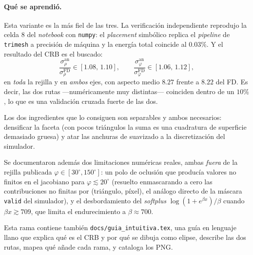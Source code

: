 \documentclass[11pt,a4paper]{article}
\newcommand{\code}[1]{\texttt{#1}}
\theoremstyle{definition}
\begin{document}
\paragraph{Qué se aprendió.}
Esta variante es la más fiel de las tres. La verificación independiente
reprodujo la celda 8 del \emph{notebook} con \code{numpy}: el \emph{placement}
simbólico replica el \emph{pipeline} de \code{trimesh} a precisión de máquina y
la energía total coincide al $0.03\%$. Y el resultado del CRB es el buscado:
%
\begin{equation}
\frac{\sigma_\rho^{\text{an}}}{\sigma_\rho^{\text{FD}}}\in[1.08,\,1.10],
\qquad
\frac{\sigma_\varphi^{\text{an}}}{\sigma_\varphi^{\text{FD}}}\in[1.06,\,1.12],
\end{equation}
%
en \emph{toda} la rejilla y en \emph{ambos} ejes, con aspecto medio $8.27$
frente a $8.22$ del FD. Es decir, las dos rutas ---numéricamente muy distintas---
coinciden dentro de un $10\%$, lo que es una validación cruzada fuerte de las
dos.

Los dos ingredientes que lo consiguen son separables y ambos necesarios:
densificar la faceta (con pocos triángulos la suma es una cuadratura de
superficie demasiado gruesa) y atar las anchuras de suavizado a la
discretización del simulador.

Se documentaron además dos limitaciones numéricas reales, ambas \emph{fuera} de
la rejilla publicada $\varphi\in[30^\circ,150^\circ]$: un polo de oclusión que
producía valores no finitos en el jacobiano para $\varphi\lesssim20^\circ$
(resuelto enmascarando a cero las contribuciones no finitas por
(triángulo, píxel), el análogo directo de la máscara \code{valid} del
simulador), y el desbordamiento del \emph{softplus} $\log(1+e^{\beta x})/\beta$
cuando $\beta x\gtrsim709$, que limita el endurecimiento a $\beta\approx700$.

Esta rama contiene también \code{docs/guia\_intuitiva.tex}, una guía en lenguaje
llano que explica qué es el CRB y por qué se dibuja como elipse, describe las
dos rutas, mapea qué añade cada rama, y cataloga los PNG.
\end{document}
